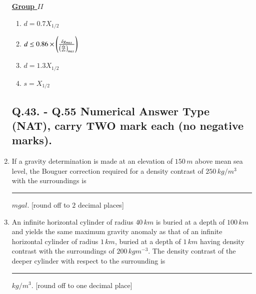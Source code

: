 \documentclass[journal,12pt,onecolumn]{IEEEtran}
\theoremstyle{remark}
\begin{document}
\begin{enumerate}
\begin{multicols}{2}
                \underline{\textbf{Group $II$}}
                \begin{enumerate}
                    \item $d = 0.7 X_{1/2}$
                    \item $d \leq 0.86 \times \left(\frac{\delta g_{max}}{\left(\frac{dg}{dx} \right)_{max}}\right)$
                    \item $d = 1.3 X_{1/2}$
                    \item $s = X_{1/2}$
                \end{enumerate}
            \end{multicols}
    
            \begin{enumerate}
            \end{enumerate}

\subsection*{Q.43. - Q.55 Numerical Answer Type (NAT), carry TWO mark each (no negative marks).}


    \item If a gravity determination is made at an elevation of $150\,m$ above mean sea level, the Bouguer correction required for a density contrast of $250\,kg/m^3$ with the surroundings is \rule{3cm}{0.15mm} $mgal$. [round off to $2$ decimal places] \hfill{}
    
    \item An infinite horizontal cylinder of radius $40\,km$ is buried at a depth of $100\,km$ and yields the same maximum gravity anomaly as that of an infinite horizontal cylinder of radius $1\,km$, buried at a depth of $1\,km$ having density contrast with the surroundings of $200\,kgm^{-3}$. The density contrast of the deeper cylinder with respect to the surrounding is \rule{3cm}{0.15mm} $kg/m^3$. [round off to one decimal place]  \hfill{}
    

\end{enumerate}
\end{document}
